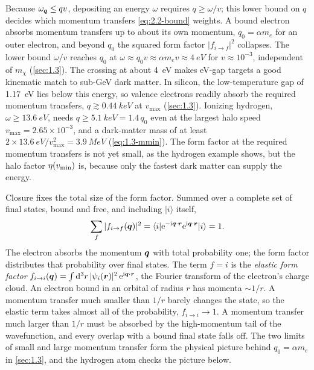 Because $\omega_{\bm{q}} \le qv$, depositing an energy $\omega$ requires $q \ge \omega/v$; this lower bound on $q$ decides which momentum transfers \cref{eq:2.2-bound} weights. A bound electron absorbs momentum transfers up to about its own momentum, $q_0 = \alpha m_e$ for an outer electron, and beyond $q_0$ the squared form factor $|f_{i\to f}|^2$ collapses. The lower bound $\omega/v$ reaches $q_0$ at $\omega \approx q_0v \approx \alpha m_ev \approx \SI{4}{eV}$ for $v \approx 10^{-3}$, independent of $m_\chi$ (\cref{sec:1.3}). The crossing at about \SI{4}{eV} makes eV-gap targets a good kinematic match to sub-GeV dark matter. In silicon, the low-temperature gap of \SI{1.17}{eV} lies below this energy, so valence electrons readily absorb the required momentum transfers, $q \gtrsim \SI{0.44}{keV}$ at $v_{\mathrm{max}}$ (\cref{sec:1.3}). Ionizing hydrogen, $\omega \ge \SI{13.6}{eV}$, needs $q \ge \SI{5.1}{keV} = 1.4\,q_0$ even at the largest halo speed $v_{\mathrm{max}} = 2.65\times10^{-3}$, and a dark-matter mass of at least $2\times\SI{13.6}{eV}/v_{\mathrm{max}}^2 = \SI{3.9}{MeV}$ (\cref{eq:1.3-mmin}). The form factor at the required momentum transfers is not yet small, as the hydrogen example shows, but the halo factor $\eta(v_{\mathrm{min}})$ is, because only the fastest dark matter can supply the energy.

Closure fixes the total size of the form factor. Summed over a complete set of final states, bound and free, and including $|i\rangle$ itself,
\begin{equation}
  \sum_f|f_{i\to f}(\bm{q})|^2 = \langle i|\mathrm{e}^{-\mathrm{i}\bm{q}\cdot\bm{r}}\mathrm{e}^{\mathrm{i}\bm{q}\cdot\bm{r}}|i\rangle = 1 .
  \label{eq:2.2-closure}
\end{equation}
The electron absorbs the momentum $\bm{q}$ with total probability one; the form factor distributes that probability over final states. The term $f = i$ is the \emph{elastic form factor} $f_{i\to i}(\bm{q}) = \int\mathrm{d}^3r\,|\psi_i(\bm{r})|^2\,\mathrm{e}^{\mathrm{i}\bm{q}\cdot\bm{r}}$, the Fourier transform of the electron's charge cloud. An electron bound in an orbital of radius $r$ has momenta $\sim 1/r$. A momentum transfer much smaller than $1/r$ barely changes the state, so the elastic term takes almost all of the probability, $f_{i\to i} \to 1$. A momentum transfer much larger than $1/r$ must be absorbed by the high-momentum tail of the wavefunction, and every overlap with a bound final state falls off. The two limits of small and large momentum transfer form the physical picture behind $q_0 = \alpha m_e$ in \cref{sec:1.3}, and the hydrogen atom checks the picture below.

